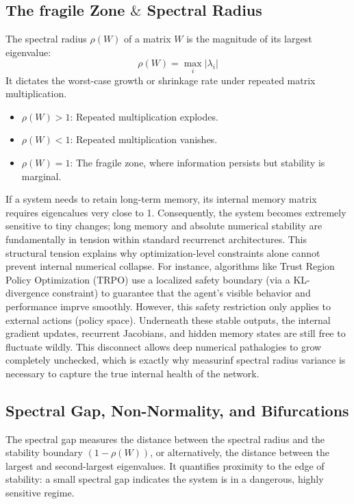 \documentclass[11pt,a4paper]{article}
\begin{document}
\subsection{The fragile Zone $\&$ Spectral Radius}
The spectral radius $\rho(W)$ of a matrix $W$ is the magnitude of its largest eigenvalue: 
\begin{equation}
    \rho(W) = \max_i |\lambda_i|
\end{equation}
It dictates the worst-case growth or shrinkage rate under repeated matrix multiplication. 
\begin{itemize}
    \item  $\rho(W) > 1$: Repeated multiplication explodes. 
    \item $\rho(W) < 1$: Repeated multiplication vanishes.
    \item $\rho(W) = 1$: The fragile zone, where information persists but stability is marginal. 

\end{itemize}
If a system needs to retain long-term memory, its internal memory matrix requires eigencalues very close to 1. Consequently, the system becomes extremely sensitive to tiny changes; long memory and absolute numerical stability are fundamentally in tension within standard recurrenct architectures. 
This structural tension explains why optimization-level constraints alone cannot prevent internal numerical collapse. For instance, algorithms like Trust Region Policy Optimization (TRPO) use a localized safety boundary (via a KL-divergence constraint) to guarantee that the agent's visible behavior and performance imprve smoothly. However, this safety restriction only applies to external actions (policy space). Underneath these stable outputs, the internal gradient updates, recurrent Jacobians, and hidden memory states are still free to fluctuate wildly. This disconnect allows deep numerical pathalogies to grow completely unchecked, which is exactly why measurinf spectral radius variance is necessary to capture the true internal health of the network. 

\subsection{Spectral Gap, Non-Normality, and Bifurcations}
The spectral gap measures the distance between the spectral radius and the stability boundary $(1-\rho(W))$, or alternatively, the distance between the largest and second-largest eigenvalues. It quantifies proximity to the edge of stability: a small spectral gap indicates the system is in a dangerous, highly sensitive regime. 
\end{document}
